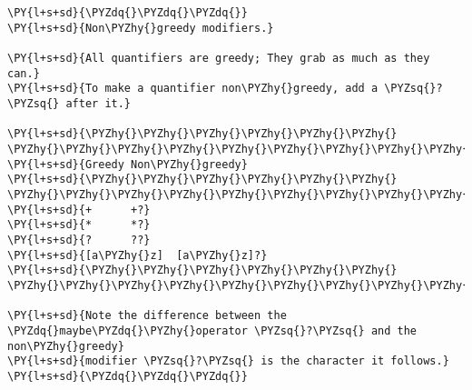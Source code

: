 

\section*{}

\begin{Verbatim}[commandchars=\\\{\}]
\PY{l+s+sd}{\PYZdq{}\PYZdq{}\PYZdq{}}
\PY{l+s+sd}{Non\PYZhy{}greedy modifiers.}

\PY{l+s+sd}{All quantifiers are greedy; They grab as much as they can.}
\PY{l+s+sd}{To make a quantifier non\PYZhy{}greedy, add a \PYZsq{}?\PYZsq{} after it.}

\PY{l+s+sd}{\PYZhy{}\PYZhy{}\PYZhy{}\PYZhy{}\PYZhy{}\PYZhy{} \PYZhy{}\PYZhy{}\PYZhy{}\PYZhy{}\PYZhy{}\PYZhy{}\PYZhy{}\PYZhy{}\PYZhy{}\PYZhy{}}
\PY{l+s+sd}{Greedy Non\PYZhy{}greedy}
\PY{l+s+sd}{\PYZhy{}\PYZhy{}\PYZhy{}\PYZhy{}\PYZhy{}\PYZhy{} \PYZhy{}\PYZhy{}\PYZhy{}\PYZhy{}\PYZhy{}\PYZhy{}\PYZhy{}\PYZhy{}\PYZhy{}\PYZhy{}}
\PY{l+s+sd}{+      +?}
\PY{l+s+sd}{*      *?}
\PY{l+s+sd}{?      ??}
\PY{l+s+sd}{[a\PYZhy{}z]  [a\PYZhy{}z]?}
\PY{l+s+sd}{\PYZhy{}\PYZhy{}\PYZhy{}\PYZhy{}\PYZhy{}\PYZhy{} \PYZhy{}\PYZhy{}\PYZhy{}\PYZhy{}\PYZhy{}\PYZhy{}\PYZhy{}\PYZhy{}\PYZhy{}\PYZhy{}}

\PY{l+s+sd}{Note the difference between the \PYZdq{}maybe\PYZdq{}\PYZhy{}operator \PYZsq{}?\PYZsq{} and the non\PYZhy{}greedy}
\PY{l+s+sd}{modifier \PYZsq{}?\PYZsq{} is the character it follows.}
\PY{l+s+sd}{\PYZdq{}\PYZdq{}\PYZdq{}}
\end{Verbatim}

